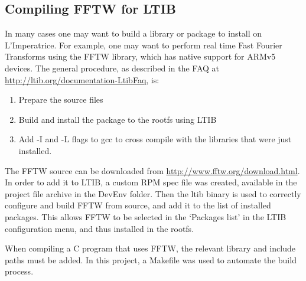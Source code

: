 	\subsection{Compiling FFTW for LTIB} %
	\label{apdx:compiling_fftw_for_ltib}
		In many cases one may want to build a library or package to install on L'Imperatrice.  For example, one may want to perform real time Fast Fourier Transforms using the FFTW library, which has native support for ARMv5 devices.  The general procedure, as described in the FAQ at \href{http://ltib.org/documentation-LtibFaq}{http://ltib.org/documentation-LtibFaq}, is:
		\begin{enumerate}
			\item Prepare the source files
			\item Build and install the package to the rootfs using LTIB
			\item Add -I and -L flags to gcc to cross compile with the libraries that were just installed.
		\end{enumerate}

		The FFTW source can be downloaded from \href{http://www.fftw.org/download.html}{http://www.fftw.org/download.html}.  In order to add it to LTIB, a custom RPM spec file was created, available in the project file archive in the DevEnv folder.  Then the ltib binary is used to correctly configure and build FFTW from source, and add it to the list of installed packages.  This allows FFTW to be selected in the `Packages list' in the LTIB configuration menu, and thus installed in the rootfs.

		When compiling a C program that uses FFTW, the relevant library and include paths must be added.  In this project, a Makefile was used to automate the build process.


